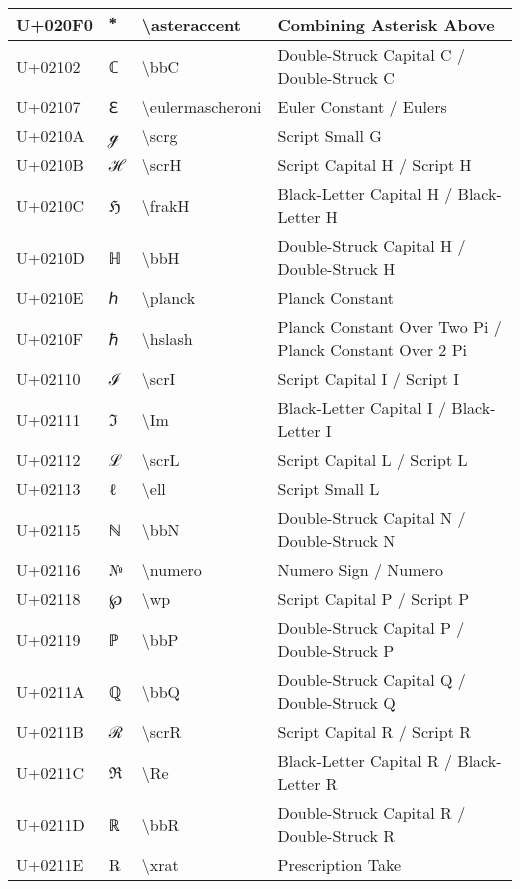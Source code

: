 \begin{table}[h]
\begin{tabulary}{\linewidth}{|L|L|L|L|}
\hline
U+020F0 &  ⃰  & {\textbackslash}asteraccent & Combining Asterisk Above \\
\hline
U+02102 & ℂ & {\textbackslash}bbC & Double-Struck Capital C / Double-Struck C \\
\hline
U+02107 & ℇ & {\textbackslash}eulermascheroni & Euler Constant / Eulers \\
\hline
U+0210A & ℊ & {\textbackslash}scrg & Script Small G \\
\hline
U+0210B & ℋ & {\textbackslash}scrH & Script Capital H / Script H \\
\hline
U+0210C & ℌ & {\textbackslash}frakH & Black-Letter Capital H / Black-Letter H \\
\hline
U+0210D & ℍ & {\textbackslash}bbH & Double-Struck Capital H / Double-Struck H \\
\hline
U+0210E & ℎ & {\textbackslash}planck & Planck Constant \\
\hline
U+0210F & ℏ & {\textbackslash}hslash & Planck Constant Over Two Pi / Planck Constant Over 2 Pi \\
\hline
U+02110 & ℐ & {\textbackslash}scrI & Script Capital I / Script I \\
\hline
U+02111 & ℑ & {\textbackslash}Im & Black-Letter Capital I / Black-Letter I \\
\hline
U+02112 & ℒ & {\textbackslash}scrL & Script Capital L / Script L \\
\hline
U+02113 & ℓ & {\textbackslash}ell & Script Small L \\
\hline
U+02115 & ℕ & {\textbackslash}bbN & Double-Struck Capital N / Double-Struck N \\
\hline
U+02116 & № & {\textbackslash}numero & Numero Sign / Numero \\
\hline
U+02118 & ℘ & {\textbackslash}wp & Script Capital P / Script P \\
\hline
U+02119 & ℙ & {\textbackslash}bbP & Double-Struck Capital P / Double-Struck P \\
\hline
U+0211A & ℚ & {\textbackslash}bbQ & Double-Struck Capital Q / Double-Struck Q \\
\hline
U+0211B & ℛ & {\textbackslash}scrR & Script Capital R / Script R \\
\hline
U+0211C & ℜ & {\textbackslash}Re & Black-Letter Capital R / Black-Letter R \\
\hline
U+0211D & ℝ & {\textbackslash}bbR & Double-Struck Capital R / Double-Struck R \\
\hline
U+0211E & ℞ & {\textbackslash}xrat & Prescription Take \\

\end{tabulary}
\end{table}

